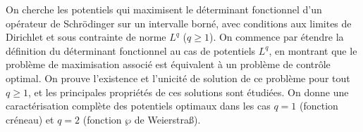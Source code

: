 \documentclass[JEP,XML,SOM,Unicode,NoEqCountersInSection,NoFloatCountersInSection]{cedram}
\theoremstyle{plain}
\theoremstyle{definition}
\begin{document}




\begin{altabstract}
On cherche les potentiels qui maximisent le déterminant fonctionnel d’un opérateur de Schrödinger sur un intervalle borné, avec conditions aux limites de Dirichlet et sous contrainte de norme $L^q$ ($q \geq 1$). On commence par étendre la définition du déterminant fonctionnel au cas de potentiels $L^q$, en montrant que le problème de maximisation associé est équivalent à un problème de contrôle optimal. On prouve l’existence et l’unicité de solution de ce problème pour tout $q \geq 1$, et les principales propriétés de ces solutions sont étudiées. On donne une caractérisation complète des potentiels optimaux dans les cas $q=1$ (fonction créneau) et $q=2$ (fonction $\wp$ de Weierstra\ss).
\end{altabstract}

\maketitle
\tableofcontents
\mainmatter
\end{document}
